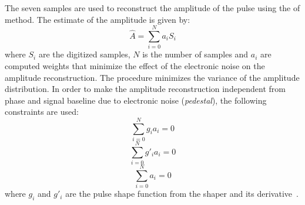 The seven samples are used to reconstruct the amplitude of the pulse using the
\gls{of} method. The estimate of the amplitude is given by:
\begin{equation}
  \label{eq:66}
  \hat{A} = \sum_{i = 0}^N a_i S_i
\end{equation}
where $S_i$ are the digitized samples, $N$ is the number of samples and $a_i$
are computed weights that minimize the effect of the electronic noise on the
amplitude reconstruction. The procedure minimizes the variance of the amplitude
distribution. In order to make the amplitude reconstruction independent from
phase and signal baseline due to electronic noise (\emph{pedestal}), the
following constraints are used:
\begin{equation}
  \label{eq:67}
  \sum_{i = 0}^N g_i a_i = 0
\end{equation}
\begin{equation}
  \label{eq:68}
  \sum_{i = 0}^N g'_i a_i = 0
\end{equation}
\begin{equation}
  \label{eq:69}
  \sum_{i = 0}^N a_i = 0
\end{equation}
where $g_i$ and $g'_i$ are the pulse shape function from the shaper and its
derivative~\cite{OptimalFilter}.
